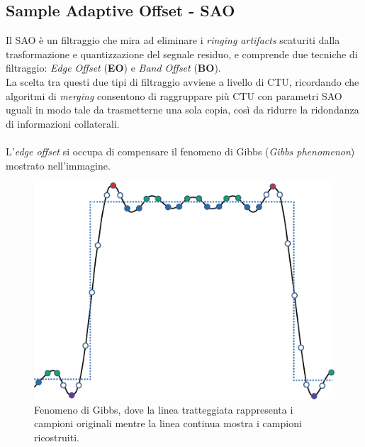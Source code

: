 
\subsection{Sample Adaptive Offset - SAO}
Il SAO è un filtraggio che mira ad eliminare i \emph{ringing artifacts} 
scaturiti dalla trasformazione e quantizzazione del segnale residuo, e 
comprende due tecniche di filtraggio: \emph{Edge Offset} (\textbf{EO}) e 
\emph{Band Offset} (\textbf{BO}).\\
La scelta tra questi due tipi di filtraggio avviene a livello di CTU, ricordando
che  algoritmi di \emph{merging} consentono di raggruppare più CTU con parametri
SAO uguali in modo tale da trasmetterne una sola copia, così da ridurre la 
ridondanza di informazioni collaterali.
\\ \\
L'\emph{edge offset} si occupa di compensare il fenomeno di Gibbs (\emph{Gibbs
phenomenon}) mostrato nell'immagine.

\begin{figure}[H]
  \centering
  \captionsetup{justification=raggedright}
  \includegraphics[scale=0.3]{Figures/SAO_Gibbs}
  \caption[Fenomeno di Gibbs]
  	  {Fenomeno di Gibbs, dove la linea tratteggiata rappresenta i
	   campioni originali mentre la linea continua mostra i campioni
	   ricostruiti.}
\end{figure}


